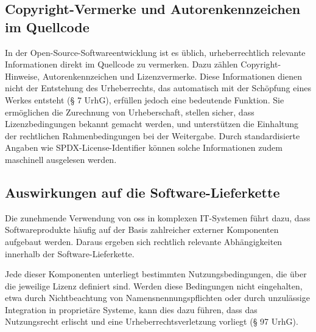 
\subsection{Copyright-Vermerke und Autorenkennzeichen im Quellcode}

In der Open-Source-Softwareentwicklung ist es üblich, urheberrechtlich relevante Informationen direkt im Quellcode zu vermerken.
Dazu zählen Copyright-Hinweise, Autorenkennzeichen und Lizenzvermerke.
Diese Informationen dienen nicht der Entstehung des Urheberrechts, das automatisch mit der Schöpfung eines Werkes entsteht (§ 7 UrhG), erfüllen jedoch eine bedeutende Funktion.
Sie ermöglichen die Zurechnung von Urheberschaft, stellen sicher, dass Lizenzbedingungen bekannt gemacht werden, und unterstützen die Einhaltung der rechtlichen Rahmenbedingungen bei der Weitergabe.
Durch standardisierte Angaben wie SPDX-License-Identifier können solche Informationen zudem maschinell ausgelesen werden.



\subsection{Auswirkungen auf die Software-Lieferkette}

Die zunehmende Verwendung von \gls{oss} in komplexen IT-Systemen führt dazu, dass Softwareprodukte häufig auf der Basis zahlreicher externer Komponenten aufgebaut werden.
Daraus ergeben sich rechtlich relevante Abhängigkeiten innerhalb der Software-Lieferkette.

Jede dieser Komponenten unterliegt bestimmten Nutzungsbedingungen, die über die jeweilige Lizenz definiert sind.
Werden diese Bedingungen nicht eingehalten, etwa durch Nichtbeachtung von Namensnennungspflichten oder durch unzulässige Integration in proprietäre Systeme, kann dies dazu führen, dass das Nutzungsrecht erlischt und eine Urheberrechtsverletzung vorliegt (§ 97 UrhG).

